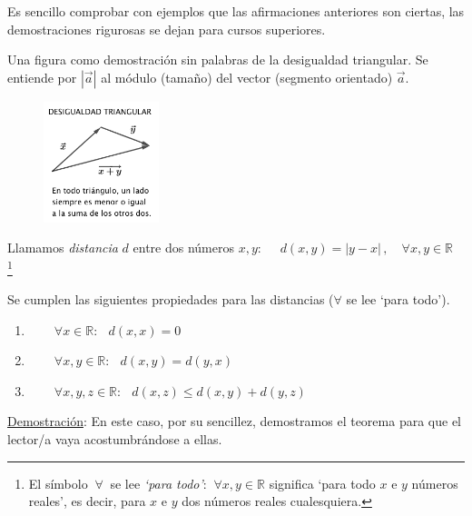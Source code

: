 \begin{multicols}{2}
Es sencillo comprobar con ejemplos que las afirmaciones anteriores son ciertas, las demostraciones rigurosas se dejan para cursos superiores. 

Una figura como demostración sin palabras de la desigualdad triangular. Se entiende por $|\vec a|$ al módulo (tamaño) del vector (segmento orientado) $\vec a$.
	
\begin{figure}[H]
	\centering
	\includegraphics[width=0.3\textwidth]{img-reales/reales07.png}
\end{figure}
\end{multicols}

		
\begin{definition} 

Llamamos \emph{distancia} $d$ entre dos números $x,y:\quad$ $ d(x,y)=|y-x|\, , \quad \forall x,y \in \mathbb R \ $ \footnote{ El símbolo $\ \forall \ $  se lee \emph{`para todo'}: $\ \forall x,y\in \mathbb R$ significa `para todo $x$ e $y$ números reales', es decir, para $x$ e $y$ dos números reales cualesquiera.}
\end{definition}
		


\begin{theorem}

Se cumplen las siguientes propiedades para las distancias ($\forall$ se lee `para todo'). 
		
\begin{enumerate}[D1]
	\item  $\qquad \forall x \in \mathbb R:\; \ \ d(x,x)=0 $
	\item  $\qquad \forall x, y \in \mathbb R:\; \ \ d(x,y)=d(y,x)$
	\item  $\qquad \forall x, y, z \in \mathbb R:\; \ \ d(x,z) \le d(x,y)+d(y,z)$
\end{enumerate}
\end{theorem}		
		
\underline{Demostración}: En este caso, por su sencillez, demostramos el teorema para que el lector/a vaya acostumbrándose a ellas.

